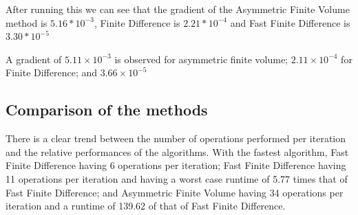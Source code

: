 \documentclass[aps,twocolumn,pre,nofootinbib,10pt]{revtex4-1}
\begin{document}
After running this we can see that the gradient of the Asymmetric Finite Volume method is $5.16*10^{-3}$, Finite Difference is $2.21*10^{-4}$ and Fast Finite Difference is $3.30*10^{-5}$

A gradient of $5.11 \times 10^{-3}$ is observed for asymmetric finite volume; $2.11 \times 10^{-4}$ for Finite Difference; and $3.66 \times 10^{-5}$

\subsection{Comparison of the methods}

There is a clear trend between the number of operations performed per iteration and the relative performances of the algorithms. With the fastest algorithm, Fast Finite Difference having 6 operations per iteration; Fast Finite Difference having 11 operations per iteration and having a worst case runtime of 5.77 times that of Fast Finite Difference; and Asymmetric Finite Volume having 34 operations per iteration and a runtime of 139.62 of that of Fast Finite Difference.
\end{document}
